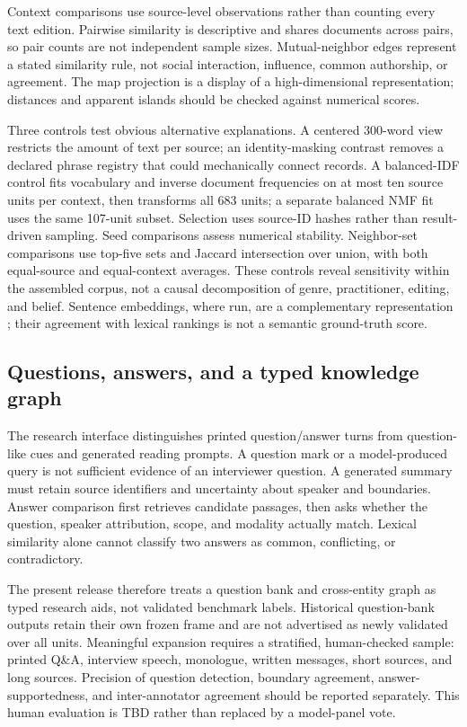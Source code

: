 Context comparisons use source-level observations rather than counting every text edition. Pairwise similarity is descriptive and shares documents across pairs, so pair counts are not independent sample sizes. Mutual-neighbor edges represent a stated similarity rule, not social interaction, influence, common authorship, or agreement. The map projection is a display of a high-dimensional representation; distances and apparent islands should be checked against numerical scores.

Three controls test obvious alternative explanations. A centered 300-word view restricts the amount of text per source; an identity-masking contrast removes a declared phrase registry that could mechanically connect records. A balanced-IDF control fits vocabulary and inverse document frequencies on at most ten source units per context, then transforms all 683 units; a separate balanced NMF fit uses the same 107-unit subset. Selection uses source-ID hashes rather than result-driven sampling. Seed comparisons assess numerical stability. Neighbor-set comparisons use top-five sets and Jaccard intersection over union, with both equal-source and equal-context averages. These controls reveal sensitivity within the assembled corpus, not a causal decomposition of genre, practitioner, editing, and belief. Sentence embeddings, where run, are a complementary representation \citep{reimers2019sentencebert}; their agreement with lexical rankings is not a semantic ground-truth score.



\subsection{Questions, answers, and a typed knowledge graph}
The research interface distinguishes printed question/answer turns from question-like cues and generated reading prompts. A question mark or a model-produced query is not sufficient evidence of an interviewer question. A generated summary must retain source identifiers and uncertainty about speaker and boundaries. Answer comparison first retrieves candidate passages, then asks whether the question, speaker attribution, scope, and modality actually match. Lexical similarity alone cannot classify two answers as common, conflicting, or contradictory.

The present release therefore treats a question bank and cross-entity graph as typed research aids, not validated benchmark labels. Historical question-bank outputs retain their own frozen frame and are not advertised as newly validated over all \SourceCount{} units. Meaningful expansion requires a stratified, human-checked sample: printed Q\&A, interview speech, monologue, written messages, short sources, and long sources. Precision of question detection, boundary agreement, answer-supportedness, and inter-annotator agreement should be reported separately. This human evaluation is TBD rather than replaced by a model-panel vote.

